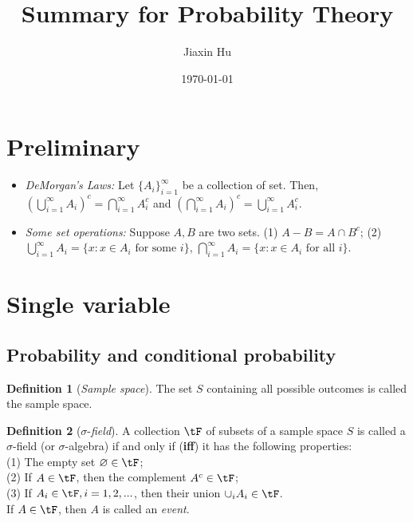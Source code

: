 \documentclass[11pt]{article}
\title{Summary for Probability Theory}
\date{\today}
\author{%
Jiaxin Hu
}
\theoremstyle{plain}
\theoremstyle{definition}
\newtheorem{defn}{Definition}
\begin{document}

\maketitle


\section{Preliminary}
\begin{itemize}
	\item \textit{DeMorgan's Laws:} Let $\{A_i \}_{i=1}^{\infty}$ be a collection of set. Then, $(\bigcup_{i = 1}^{\infty} A_i)^c = \bigcap_{i=1}^{\infty} A_i^c$ and   $(\bigcap_{i = 1}^{\infty} A_i)^c = \bigcup_{i=1}^{\infty} A_i^c$.
	\item \textit{Some set operations:} Suppose $A,B$ are two sets. (1) $A-B = A \cap B^c$; (2) $\bigcup_{i= 1}^{\infty} A_i = \{x: x\in A_i \text{ for some }i\}$,  $\bigcap_{i= 1}^{\infty} A_i = \{x: x\in A_i \text{ for all }i\}$.
\end{itemize}

\section{Single variable}
\subsection{Probability and conditional probability}
\begin{defn}[\textit{Sample space}]\label{def:samplespace}
     The set $S$ containing all possible outcomes is called the sample space.
\end{defn}

\begin{defn}[$\sigma$-\textit{field}]\label{def:sfield} 
	A collection $\tF$ of subsets of a sample space $S$ is called a $\sigma$-field (or $\sigma$-algebra) if and only if (\textbf{iff}) it has the following properties: \\(1) The empty set $\varnothing \in \tF$; \\(2) If $A \in \tF$, then the complement $A^c \in \tF$;\\ (3) If $A_i \in \tF, i = 1,2,...$, then their union $\cup_i A_i \in \tF$.\\
	If $A \in \tF$, then $A$ is called an \textit{event}.
\end{defn}
\end{document}
